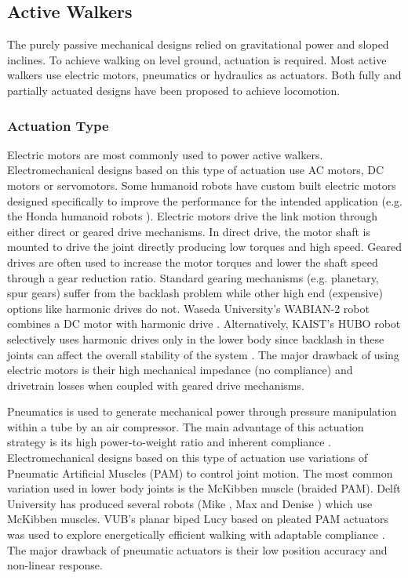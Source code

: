 

\subsection{Active Walkers} %
\label{sub:related_active_designs}
The purely passive mechanical designs relied on gravitational power and sloped inclines. To achieve walking on level ground, actuation is required. Most active walkers use  electric motors, pneumatics or hydraulics as actuators. Both fully and partially actuated designs have been proposed to achieve locomotion. 

\subsubsection{Actuation Type} %
\label{ssub:actuation_type}

Electric motors are most commonly used to power active walkers. Electromechanical designs based on this type of actuation use AC motors, DC motors or servomotors. Some humanoid robots have custom built electric motors designed specifically to improve the performance for the intended application (e.g. the Honda humanoid robots \cite{Sakagami:2002cf,Hirai1998}). Electric motors drive the link motion through either direct or geared drive mechanisms. In direct drive, the motor shaft is mounted to drive the joint directly producing low torques and high speed. Geared drives are often used to increase the motor torques and lower the shaft speed through a gear reduction ratio. Standard gearing mechanisms (e.g. planetary, spur gears) suffer from the backlash problem while other high end (expensive) options like harmonic drives do not. Waseda University's WABIAN-2 robot combines a DC motor with harmonic drive \cite{Ogura:2006bm}. Alternatively, KAIST's HUBO robot selectively uses harmonic drives only in the lower body since backlash in these joints can affect the overall stability of the system \cite{IllWooPark:2005et}. The major drawback of using electric motors is their high mechanical impedance (no compliance) and drivetrain losses when coupled with geared drive mechanisms.  

Pneumatics is used to generate mechanical power through pressure manipulation within a tube by an air compressor. The main advantage of this actuation strategy is its high power-to-weight ratio and inherent compliance \cite{Wisse2007}. Electromechanical designs based on this type of actuation use variations of Pneumatic Artificial Muscles (PAM) to control joint motion. The most common variation used in lower body joints is the McKibben muscle (braided PAM). Delft University has produced several robots (Mike \cite{Wisse2003}, Max \cite{Hobbelen2005} and Denise \cite{Hobbelen2008,Wisse:2007wh}) which use McKibben muscles. VUB's planar biped Lucy based on pleated PAM actuators was used to explore energetically efficient walking with adaptable compliance \cite{Vanderborght:2005kq}. The major drawback of pneumatic actuators is their low position accuracy and non-linear response. 

